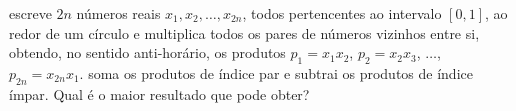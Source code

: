  escreve $2n$ números reais $x_1, x_2, \dots, x_{2n}$, todos pertencentes ao intervalo $[0,1]$, ao redor de um círculo e multiplica todos os pares de números vizinhos entre si, obtendo, no sentido anti-horário, os produtos $p_1 = x_1 x_2$, $p_2 = x_2 x_3$, $\dots$, $p_{2n} = x_{2n} x_1$.  soma os produtos de índice par e subtrai os produtos de índice ímpar. Qual é o maior resultado que  pode obter?
